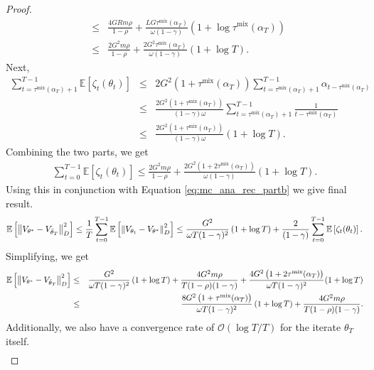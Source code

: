 \documentclass{colt2018} %
\DeclareMathOperator*{\mix}{mix}
\begin{document}
\begin{proof}
\begin{eqnarray*}
&\leq& \frac{4GR m \rho}{1-\rho} + \frac{LG \tau^{\mix}(\alpha_T)}{\omega(1-\gamma)} (1 + \log \tau^{\mix}(\alpha_T))\\
&\leq& \frac{2G^2 m \rho}{1-\rho} + \frac{2G^2 \tau^{\mix}(\alpha_T)}{\omega(1-\gamma)} (1 + \log T).
\end{eqnarray*}
Next, 
\begin{eqnarray*}
\sum_{t=\tau^{\mix}(\alpha_T) + 1}^{T-1} \mathbb{E}\left[\zeta_t(\theta_t)\right] &\leq& 2G^2 \left(1 + \tau^{\mix}(\alpha_T)\right) \sum_{t=\tau^{\mix}(\alpha_T) + 1}^{T-1} \alpha_{t-\tau^{\mix}(\alpha_T)} \\
&\leq& \frac{2G^2 \left(1 + \tau^{\mix}(\alpha_T)\right)}{(1-\gamma)\omega} \sum_{t=\tau^{\mix}(\alpha_T) + 1}^{T-1} \frac{1}{t-\tau^{\mix}(\alpha_T)} \\
&\leq& \frac{2G^2 \left(1 + \tau^{\mix}(\alpha_T)\right)}{(1-\gamma)\omega} \left(1 + \log T \right).
\end{eqnarray*}
Combining the two parts, we get 
\begin{eqnarray*}
\sum_{t=0}^{T-1} \mathbb{E}\left[\zeta_t(\theta_t)\right] \leq \frac{2G^2 m \rho}{1-\rho} + \frac{2G^2 \left(1+2\tau^{\mix}(\alpha_T)\right)}{\omega(1-\gamma)} (1 + \log T).
\end{eqnarray*}
Using this in conjunction with Equation \eqref{eq:mc_ana_rec_partb} we give final result.
\begin{eqnarray*}
\mathbb{E}\left[\norm{V_{\theta^*} - V_{\bar{\theta}_T}}^2_{D}\right] \leq \frac{1}{T} \sum_{t=0}^{T-1} \mathbb{E}\left[\norm{V_{\theta_t} - V_{\theta^*}}^2_{D}\right] \leq \frac{G^2}{\omega T(1-\gamma)^2} \left(1+\log T\right) + \frac{2}{(1-\gamma)} \sum_{t=0}^{T-1} \mathbb{E}\left[\zeta_t(\theta_t)\right].
\end{eqnarray*}
Simplifying, we get 
\begin{eqnarray*}
\mathbb{E}\left[\norm{V_{\theta^*} - V_{\bar{\theta}_T}}^2_{D}\right] &\leq& \frac{G^2}{\omega T(1-\gamma)^2} \left(1+\log T\right) + \frac{4G^2 m \rho}{T(1-\rho)(1-\gamma)} + \frac{4G^2 \left(1 + 2 \tau^{\mix}(\alpha_T)\right)}{\omega T(1-\gamma)^2} (1 + \log T) \\
&\leq& \frac{8 G^2 \left(1 + \tau^{\mix}(\alpha_T)\right)}{\omega T(1-\gamma)^2} \left(1+\log T\right) + \frac{4G^2 m \rho}{T(1-\rho)(1-\gamma)}.
\end{eqnarray*}
Additionally, we also have a convergence rate of $\mathcal{O}(\log T/T)$ for the iterate $\theta_T$ itself.
\begin{eqnarray*}
\label{eq:mc_theta_result}

\end{eqnarray*}
\end{proof}
\end{document}
